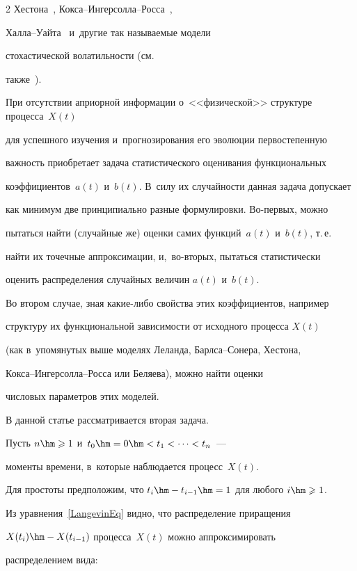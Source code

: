 \begin{multicols}{2}
Хестона~\cite{Heston1993}, Кок\-са--Ин\-гер\-сол\-ла--Рос\-са~\cite{CoxIngersollRoss1985}, 

Хал\-ла--Уай\-та~\cite{HullWhite1987} и~другие так называемые модели 

стохастической волатильности (см.\ 

также~\cite{DermanKani1994, Dupire1994, Shiryaev2016}).



При отсутствии априорной информации о~<<физической>> структуре процесса~$X(t)$ 

для успешного изучения и~прогнозирования его эволюции первостепенную 

важ\-ность приобретает задача  статистического оценивания функциональных 

коэффициентов~$a(t)$ и~$b(t)$. В~силу их слу\-чай\-ности данная задача допускает 

как минимум две принципиально разные формулировки. Во-пер\-вых, можно 

пытаться найти (случайные же) оценки самих функций~$a(t)$ и~$b(t)$, т.\,е.\ 

найти их точечные аппроксимации, и,~во-вто\-рых, пытаться статистически 

оценить распределения случайных величин $a(t)$ и~$b(t)$. 

Во втором случае, зная ка\-кие-ли\-бо свойства этих коэффициентов, например 

структуру их функциональной зависимости от исходного процесса $X(t)$ 

(как в~упомянутых выше моделях Леланда, Барл\-са--Со\-не\-ра, Хестона, 

Кок\-са--Ин\-гер\-сол\-ла--Рос\-са или Беляева), мож\-но \mbox{найти} оценки 

чис\-ло\-вых па\-ра\-мет\-ров этих моделей.



В данной статье рассматривается вторая задача. 

Пусть $n\hm\geqslant1$ и~$t_0\hm=0\hm<t_1<\cdots<t_n$~--- 

моменты времени, в~которые наблюдается процесс~$X(t)$. 

Для простоты предположим, что $t_i\hm-t_{i-1}\hm=1$ для любого $i\hm\geqslant1$. 

Из уравнения~\eqref{LangevinEq} видно, что распределение приращения 

$X(t_i)\hm-X(t_{i-1})$ процесса~$X(t)$ можно аппроксимировать 

распределением вида:


\end{multicols}
